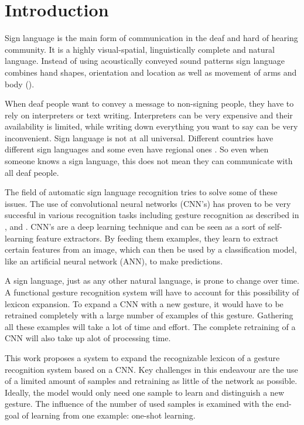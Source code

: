 \documentclass[twocolumn]{phdsymp} %
\begin{document}
\section{Introduction}
Sign language is the main form of communication in the deaf and hard of hearing community. It is a highly visual-spatial, linguistically complete and natural language. Instead of using acoustically conveyed sound patterns sign language combines hand shapes, orientation and location as well as movement of arms and body (\cite{buyens_gebarentaaltolken_2003}).
\par When deaf people want to convey a message to non-signing people, they have to rely on interpreters or text writing. Interpreters can be very expensive and their availability is limited, while writing down everything you want to say can be very inconvenient. Sign language is not at all universal. Different countries have different sign languages and some even have regional ones \cite{VGT-standard}. So even when someone knows a sign language, this does not mean they can communicate with all deaf people.
\par The field of automatic sign language recognition tries to solve some of these issues. The use of convolutional neural networks (CNN's) has proven to be very succesful in various recognition tasks including gesture recognition as described in \cite{wu_deep_2014}, \cite{cnn-ji} and \cite{lionel}. CNN's are a deep learning technique and can be seen as a sort of self-learning feature extractors. By feeding them examples, they learn to extract certain features from an image, which can then be used by a classification model, like an artificial neural network (ANN), to make predictions.
\par A sign language, just as any other natural language, is prone to change over time. A functional gesture recognition system will have to account for this possibility of lexicon expansion. To expand a CNN with a new gesture, it would have to be retrained completely with a large number of examples of this gesture. Gathering all these examples will take a lot of time and effort. The complete retraining of a CNN will also take up alot of processing time.
\par This work proposes a system to expand the recognizable lexicon of a gesture recognition system based on a CNN. Key challenges in this endeavour are the use of a limited amount of samples and retraining as little of the network as possible. Ideally, the model would only need one sample to learn and distinguish a new gesture. The influence of the number of used samples is examined with the end-goal of learning from one example: one-shot learning.
\end{document}
